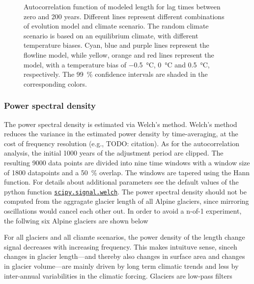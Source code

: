 \begin{figure}[htp]
        \caption{Autocorrelation function of modeled length for lag times between zero and 200 years. Different lines represent different combinations of evolution model and climate scenario.
        The random climate scenario is based on an equilibrium climate, with different temperature biases.
        Cyan, blue and purple lines represent the flowline model, while yellow, orange and red lines represent the \vas{} model, with a temperature bias of \SI{-.5}{\celsius}, \SI{0}{\celsius} and \SI{+.5}{\celsius}, respectively.
        The \SI{99}{\percent} confidence intervals are shaded in the corresponding colors.}
        \label{fig:acf}
      \end{figure}


    \subsubsection{Power spectral density} %
    \label{ssub:power_spectral_density_results}
    
      The power spectral density is estimated via Welch's method. Welch's method reduces the variance in the estimated power density by time-averaging, at the cost of frequency resolution (e.g., TODO: citation). As for the autocorrelation analysis, the initial 1000 years of the adjustment period are clipped. The resulting 9000 data points are divided into nine time windows with a window size of 1800 datapoints and a \SI{50}{\percent} overlap. The windows are tapered using the Hann function. For details about additional parameters see the default values of the python function \href{https://docs.scipy.org/doc/scipy/reference/generated/scipy.signal.welch.html}{\lstinline`scipy.signal.welch`}. The power spectral density should not be computed from the aggragate glacier length of all Alpine glaciers, since mirroring oscillations would cancel each other out. In order to avoid a n-of-1 experiment, the follwing six Alpine glaciers are shown below %

      For all glaciers and all cliamte scenarios, the power density of the length change signal decreases with increasing frequency. This makes intuituve sense, sinceh changes in glacier length---and thereby also changes in surface area and changes in glacier volume---are mainly driven by long term climatic trends and less by inter-annual variabilities in the climatic forcing. Glaciers are low-pass filters

